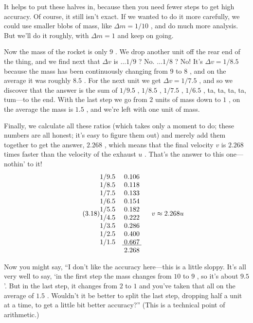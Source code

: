 \documentclass[11pt,oneside]{article}
\begin{document}
It helps to put these halves in, because then you need fewer steps to get high accuracy. Of course, it still isn't exact. If we wanted to do it more carefully, we could use smaller blobs of mass, like \(\Delta m = 1/10\) , and do much more analysis. But we'll do it roughly, with \(\Delta m = 1\) and keep on going.\par

Now the mass of the rocket is only \(9\) . We drop another unit off the rear end of the thing, and we find next that \(\Delta v\) is \(\dots1/9\) ? No. \(\dots1/8\) ? No! It's \(\Delta v = 1/8.5\) because the mass has been continuously changing from \(9\) to \(8\) , and on the average it was roughly \(8.5\) . For the next unit we get \(\Delta v = 1/7.5\) , and so we discover that the answer is the sum of \(1/9.5\) , \(1/8.5\) , \(1/7.5\) , \(1/6.5\) , ta, ta, ta, ta, tum---to the end. With the last step we go from \(2\) units of mass down to \(1\) , on the average the mass is \(1.5\) , and we're left with one unit of mass.\par

Finally, we calculate all these ratios (which takes only a moment to do; these numbers are all honest; it's easy to figure them out) and merely add them together to get the answer, \(2.268\) , which means that the final velocity \(v\) is \(2.268\) times faster than the velocity of the exhaust \(u\) . That's the answer to this one---nothin' to it! 
\begin{equation*} \tag{3.18}
\label{Eq:TIPS:3:18} \begin{matrix} 1/9.5 & 0.106 \\ 1/8.5 & 0.118 \\ 1/7.5 & 0.133 \\ 1/6.5 & 0.154 \\ 1/5.5 & 0.182 \\ 1/4.5 & 0.222 \\ 1/3.5 & 0.286 \\ 1/2.5 & 0.400 \\ 1/1.5 & \underline{\;0.667\;} \\ & 2.268 \end{matrix} \kern 1.5em v \approx 2.268 u \end{equation*}
\par

Now you might say, ``I don't like the accuracy here---this is a little sloppy. It's all very well to say, `in the first step the mass changes from \(10\) to \(9\) , so it's about \(9.5\) '. But in the last step, it changes from \(2\) to \(1\) and you've taken that all on the average of \(1.5\) . Wouldn't it be better to split the last step, dropping half a unit at a time, to get a little bit better accuracy?'' (This is a technical point of arithmetic.)\par
\end{document}
